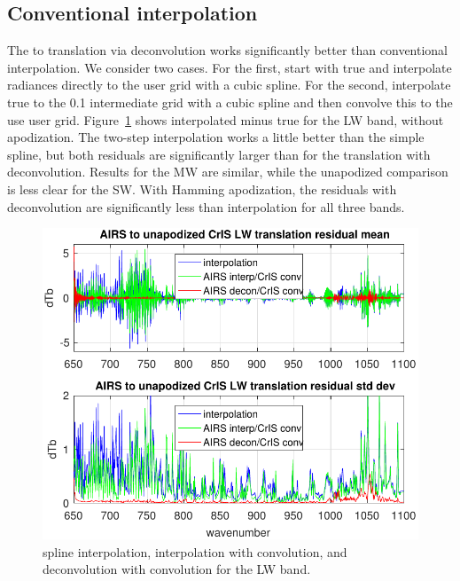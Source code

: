 \documentclass[10pt,twocolumn]{article}
\begin{document}
\subsection{Conventional interpolation}

The {\airs} to {\cris} translation via deconvolution works
significantly better than conventional interpolation.  We consider
two cases.  For the first, start with true {\airs} and interpolate
radiances directly to the {\cris} user grid with a cubic spline.
For the second, interpolate true {\airs} to the 0.1 {\wn}
intermediate grid with a cubic spline and then convolve this to the
use {\cris} user grid.  Figure~\ref{intpLW} shows interpolated
{\cris} minus true {\cris} for the LW band, without apodization.
The two-step interpolation works a little better than the simple
spline, but both residuals are significantly larger than for the
translation with deconvolution.  Results for the MW are similar,
while the unapodized comparison is less clear for the SW.  With
Hamming apodization, the residuals with deconvolution are
significantly less than interpolation for all three bands.

\begin{figure} %
  \centering
  \includegraphics[width=\linewidth]{figures/a2cris_interp_LW.pdf}
  \caption{spline interpolation, interpolation with convolution, 
    and deconvolution with convolution for the {\cris} LW band.}
  \label{intpLW}
\end{figure}
\end{document}
